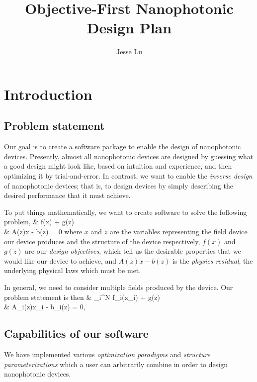 \documentclass{book}
\title{Objective-First Nanophotonic Design Plan}
\author{Jesse Lu}
\begin{document}
\maketitle
\tableofcontents


\chapter{Introduction}
\section{Problem statement}
Our goal is to create a software package 
    to enable the design of nanophotonic devices.
Presently, almost all nanophotonic devices are designed
    by guessing what a good design might look like,
    based on intuition and experience,
    and then optimizing it by trial-and-error.
In contrast, we want to enable the \emph{inverse design}
    of nanophotonic devices;
    that is, to design devices by simply describing the 
    desired performance that it must achieve.

To put things mathematically, we want to create software 
    to solve the following problem,
        {\minimize&  f(x) + g(z) \\
        \subto&     A(z)x - b(z) = 0}
    where 
    \BI $x$ and $z$ are the variables representing 
            the field device our device produces and
            the structure of the device respectively,
    \I  $f(x)$ and $g(z)$ are our \emph{design objectives},
            which tell us the desirable properties 
            that we would like our device to achieve, and
    \I  $A(z)x - b(z)$ is the \emph{physics residual},
            the underlying physical laws which must be met. \EI

In general, we need to consider multiple fields produced 
    by the device.
Our problem statement is then
        {\minimize&  \sum_i^N f_i(x_i) + g(z) \\
        \subto&     A_i(z)x_i - b_i(z) = 0,\quad{}}

\section{Capabilities of our software}
We have implemented various 
    \emph{optimization paradigms} and \emph{structure parameterizations}
    which a user can arbitrarily combine in order to 
    design nanophotonic devices.
\end{document}
